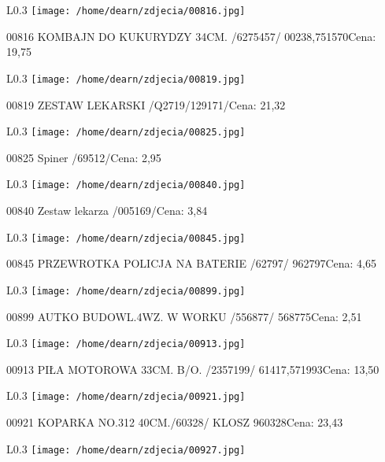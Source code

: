 \begin{wrapfigure}{L}{0.3\textwidth}
\texttt{[image: /home/dearn/zdjecia/00816.jpg]}
\end{wrapfigure}
00816 KOMBAJN DO KUKURYDZY 34CM. /6275457/      00238,751570Cena: 19,75\newline
\begin{wrapfigure}{L}{0.3\textwidth}
\texttt{[image: /home/dearn/zdjecia/00819.jpg]}
\end{wrapfigure}
00819 ZESTAW LEKARSKI /Q2719/129171/Cena: 21,32\newline
\begin{wrapfigure}{L}{0.3\textwidth}
\texttt{[image: /home/dearn/zdjecia/00825.jpg]}
\end{wrapfigure}
00825 Spiner /69512/Cena: 2,95\newline
\begin{wrapfigure}{L}{0.3\textwidth}
\texttt{[image: /home/dearn/zdjecia/00840.jpg]}
\end{wrapfigure}
00840 Zestaw lekarza /005169/Cena: 3,84\newline
\begin{wrapfigure}{L}{0.3\textwidth}
\texttt{[image: /home/dearn/zdjecia/00845.jpg]}
\end{wrapfigure}
00845 PRZEWROTKA  POLICJA NA BATERIE  /62797/         962797Cena: 4,65\newline
\begin{wrapfigure}{L}{0.3\textwidth}
\texttt{[image: /home/dearn/zdjecia/00899.jpg]}
\end{wrapfigure}
00899 AUTKO BUDOWL.4WZ. W WORKU /556877/              568775Cena: 2,51\newline
\begin{wrapfigure}{L}{0.3\textwidth}
\texttt{[image: /home/dearn/zdjecia/00913.jpg]}
\end{wrapfigure}
00913 PIŁA MOTOROWA 33CM. B/O. /2357199/        61417,571993Cena: 13,50\newline
\begin{wrapfigure}{L}{0.3\textwidth}
\texttt{[image: /home/dearn/zdjecia/00921.jpg]}
\end{wrapfigure}
00921 KOPARKA NO.312  40CM./60328/  KLOSZ             960328Cena: 23,43\newline
\begin{wrapfigure}{L}{0.3\textwidth}
\texttt{[image: /home/dearn/zdjecia/00927.jpg]}
\end{wrapfigure}
